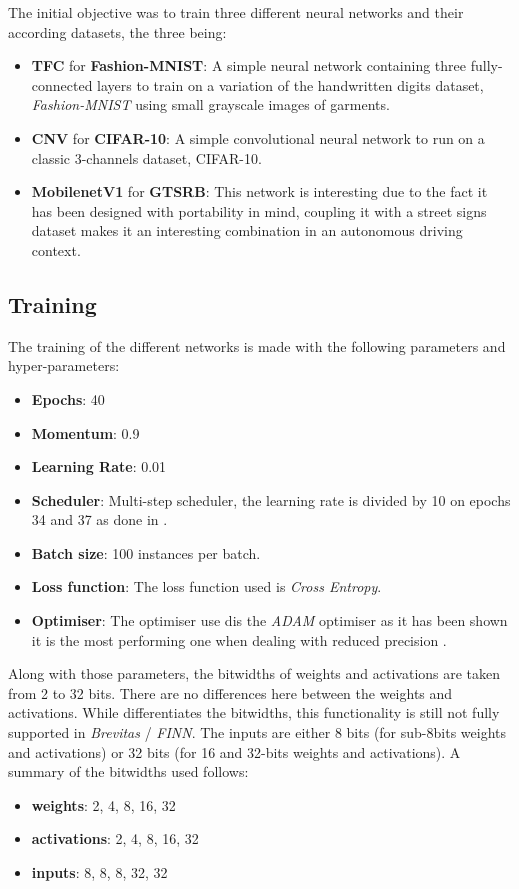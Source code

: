 The initial objective was to train three different neural networks and their according datasets, the three being:
\begin{itemize}
  \item \textbf{TFC} for \textbf{Fashion-MNIST}: A simple neural network containing three fully-connected layers to train on a variation of the handwritten digits dataset, \emph{Fashion-MNIST} using small grayscale images of garments.
  \item \textbf{CNV} for \textbf{CIFAR-10}: A simple convolutional neural network to run on a classic 3-channels dataset, CIFAR-10.
  \item \textbf{MobilenetV1} for \textbf{GTSRB}: This network is interesting due to the fact it has been designed with portability in mind, coupling it with a street signs dataset makes it an interesting combination in an autonomous driving context.
\end{itemize}


\subsection{Training}


The training of the different networks is made with the following parameters and hyper-parameters:
\begin{itemize}
  \item \textbf{Epochs}: 40
  \item \textbf{Momentum}: 0.9
  \item \textbf{Learning Rate}: 0.01
  \item \textbf{Scheduler}: Multi-step scheduler, the learning rate is divided by 10 on epochs 34 and 37 as done in \cite{}.
  \item \textbf{Batch size}: 100 instances per batch.
  \item \textbf{Loss function}: The loss function used is \emph{Cross Entropy}.
  \item \textbf{Optimiser}: The optimiser use dis the \emph{ADAM} optimiser as it has been shown it is the most performing one when dealing with reduced precision \cite{}.
\end{itemize}

Along with those parameters, the bitwidths of weights and activations are taken from 2 to 32 bits. There are no differences here between the weights and activations. While \cite{Bacchus2020} differentiates the bitwidths, this functionality is still not fully supported in \emph{Brevitas} / \emph{FINN}. The inputs are either 8 bits (for sub-8bits weights and activations) or 32 bits (for 16 and 32-bits weights and activations). A summary of the bitwidths used follows:
\begin{itemize}
  \item \textbf{weights}: 2, 4, 8, 16, 32
  \item \textbf{activations}: 2, 4, 8, 16, 32
  \item \textbf{inputs}: 8, 8, 8, 32, 32
\end{itemize}

